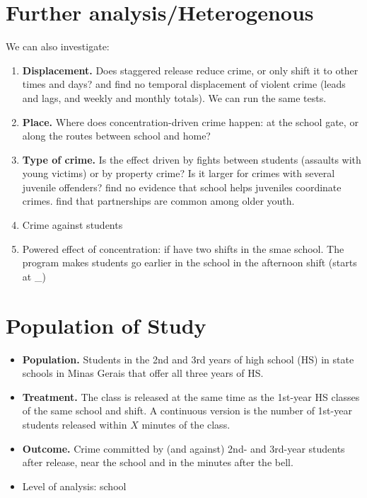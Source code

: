 \documentclass[11pt]{article}
\begin{document}
\section{Further analysis/Heterogenous}
We can also investigate:
\begin{enumerate}
  \item \textbf{Displacement.} Does staggered release reduce crime, or only
        shift it to other times and days? \citet{jacob2003} and \citet{luallen2006} find no temporal displacement of violent crime (leads and lags,
        and weekly and monthly totals). We can run the same tests.
  \item \textbf{Place.} Where does concentration-driven crime happen: at the
        school gate, or along the routes between school and home?
  \item \textbf{Type of crime.} Is the effect driven by fights between students
        (assaults with young victims) or by property crime? Is it larger for
        crimes with several juvenile offenders? \citet{jacob2003} find no
        evidence that school helps juveniles coordinate crimes. \citet{billings2019} find that partnerships are common among older
        youth.
      \item Crime against students
      \item Powered effect of concentration: if have two shifts in the smae school. The program makes students go earlier in the school in the afternoon shift (starts at \_)


\end{enumerate}



\section{Population of Study}

\begin{itemize}
  \item \textbf{Population.} Students in the 2nd and 3rd years of high school
        (HS) in state schools in Minas Gerais that offer all three years of HS.
  \item \textbf{Treatment.} The class is released at the same time as the
        1st-year HS classes of the same school and shift. A continuous version
        is the number of 1st-year students released within $X$ minutes of the
        class.
  \item \textbf{Outcome.} Crime committed by (and against) 2nd- and 3rd-year
        students after release, near the school and in the minutes after the
        bell.
\item Level of analysis: school
\end{itemize}
\end{document}
